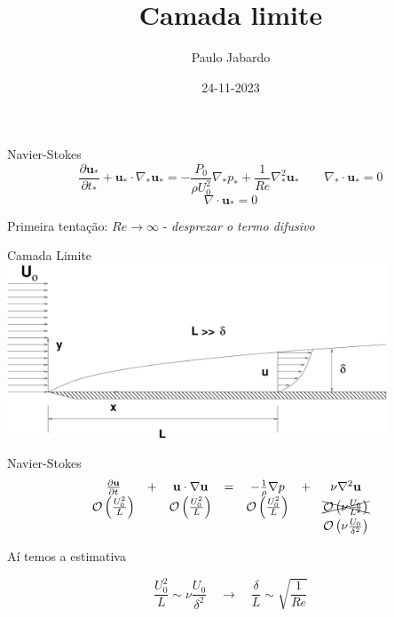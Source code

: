 \documentclass{beamer}
\title{Camada limite}
\author{Paulo Jabardo}
\date{24-11-2023}
\newcommand{\pr}[1]{\ensuremath{ \mathbf{#1}}}    %
\newcommand{\lra}{\ensuremath{\longrightarrow}}
\newcommand{\p}[1]{\ensuremath{ \mathbf{#1}}}    %
\newcommand{\qrq}{\ensuremath{\quad\lra\quad}}
\newcommand{\pd}{\ensuremath{\partial}}
\newcommand{\bigO}[1]{\ensuremath{\mathcal{O}\left(#1\right)}}
\begin{document}
\maketitle

\begin{frame}{Navier-Stokes}
\[
\frac{\pd\p{u}_*}{\pd t_*} + \p{u}_*\cdot\nabla_*\p{u_*} = -\frac{P_0}{\rho U_0^2}\nabla_* p_* + \frac{1}{Re}\nabla_*^2\p{u}_* \qquad \nabla_*\cdot\p{u}_* = 0
\]
\[
\nabla \cdot \p{u}_* = 0
\]

Primeira tentação: $Re\to\infty$ - \emph{desprezar o termo difusivo}

\end{frame}

\begin{frame}{Camada Limite}
  \centering
  \includegraphics[width=0.85\textwidth]{./figuras/camada-limite.pdf}
\end{frame}

\begin{frame}{Navier-Stokes}
  \[
\begin{matrix}
\frac{\pd\p{u}}{\pd t}& +& \p{u}\cdot\nabla\p{u}& = &-\frac{1}{\rho}\nabla p& +& \nu\nabla^2\p{u}\\
\bigO{\frac{U_0^2}{L}}& & \bigO{\frac{U_0^2}{L}} &  & \bigO{\frac{U_0^2}{L}}&  & \xcancel{\bigO{\nu\frac{U_0}{L^2}}} \\
 & & & & & & \bigO{\nu\frac{U_0}{\delta^2}}\\
\end{matrix}
  \]

  Aí temos a estimativa

  \[
  \frac{U_0^2}{L} \sim \nu\frac{U_0}{\delta^2} \qrq \frac{\delta}{L} \sim \sqrt{\frac{1}{Re}}
  \]

\end{frame}
\end{document}
